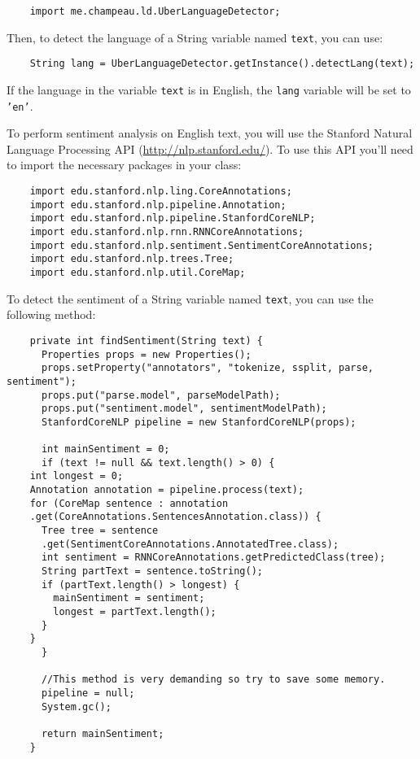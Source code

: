 \documentclass[a4paper,10pt]{article}
\begin{document}
  \lstset{language=Java}      
  \begin{lstlisting}
    import me.champeau.ld.UberLanguageDetector;
  \end{lstlisting}
  
  Then, to detect the language of a String variable named \texttt{text}, you can use: 
  
  \begin{lstlisting}
    String lang = UberLanguageDetector.getInstance().detectLang(text);
  \end{lstlisting}
  
  If the language in the variable \texttt{text} is in English, the \texttt{lang} variable will be set to \texttt{'en'}. 
  
  To perform sentiment analysis on English text, you will use the Stanford Natural Language Processing API (\url{http://nlp.stanford.edu/}). To use this API you'll need to import the necessary packages in your class: 
  
  \begin{lstlisting}
    import edu.stanford.nlp.ling.CoreAnnotations;
    import edu.stanford.nlp.pipeline.Annotation;
    import edu.stanford.nlp.pipeline.StanfordCoreNLP;
    import edu.stanford.nlp.rnn.RNNCoreAnnotations;
    import edu.stanford.nlp.sentiment.SentimentCoreAnnotations;
    import edu.stanford.nlp.trees.Tree;
    import edu.stanford.nlp.util.CoreMap;
  \end{lstlisting}
  
  To detect the sentiment of a String variable named \texttt{text}, you can use the following method:
  \begin{lstlisting}
    private int findSentiment(String text) {
      Properties props = new Properties();
      props.setProperty("annotators", "tokenize, ssplit, parse, sentiment");
      props.put("parse.model", parseModelPath);
      props.put("sentiment.model", sentimentModelPath);
      StanfordCoreNLP pipeline = new StanfordCoreNLP(props);
      
      int mainSentiment = 0;
      if (text != null && text.length() > 0) {
	int longest = 0;
	Annotation annotation = pipeline.process(text);
	for (CoreMap sentence : annotation
	.get(CoreAnnotations.SentencesAnnotation.class)) {
	  Tree tree = sentence
	  .get(SentimentCoreAnnotations.AnnotatedTree.class);
	  int sentiment = RNNCoreAnnotations.getPredictedClass(tree);
	  String partText = sentence.toString();
	  if (partText.length() > longest) {
	    mainSentiment = sentiment;
	    longest = partText.length();
	  }	  
	}
      }
      
      //This method is very demanding so try to save some memory.
      pipeline = null;
      System.gc();

      return mainSentiment;
    }
  \end{lstlisting}
  
\end{document}
